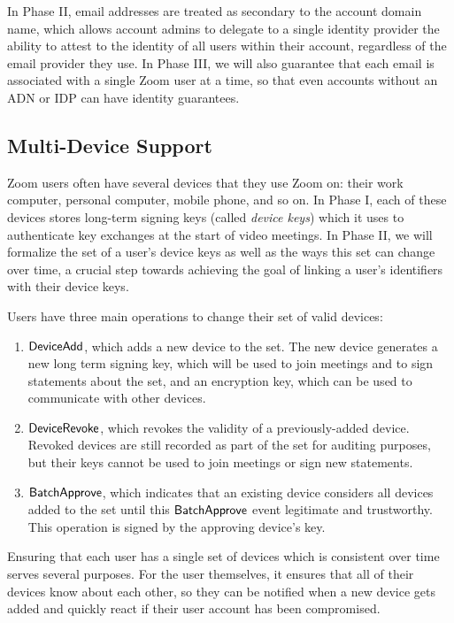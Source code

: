 In Phase II, email addresses are treated as secondary to the account domain name, which allows
account admins to delegate to a single identity provider the ability to attest to the identity of
all users within their account, regardless of the email provider they use. In Phase III, we will
also guarantee that each email is associated with a single Zoom user at a time, so that even
accounts without an ADN or IDP can have identity guarantees.

\subsection{Multi-Device Support}
\label{p2:multidev}

Zoom users often have several devices that they use Zoom on: their work computer, personal computer,
mobile phone, and so on. In Phase I, each of these devices stores long-term signing keys (called
\textit{device keys}) which it uses to authenticate key exchanges at the start of video meetings.
In Phase II, we will formalize the set of a user's device keys as well as the ways this set can
change over time, a crucial step towards achieving the goal of linking a user's identifiers with
their device keys.

Users have three main operations to change their set of valid devices:
\begin{enumerate}
\item $\mathsf{DeviceAdd}{}$, which adds a new device to the set. The new device generates a new long term
    signing key, which will be used to join meetings and to sign statements about the set, and
    an encryption key, which can be used to communicate with other devices.
\item $\mathsf{DeviceRevoke}{}$, which revokes the validity of a previously-added device. Revoked devices
    are still recorded as part of the set for auditing purposes, but their keys cannot be used to
    join meetings or sign new statements.
\item $\mathsf{BatchApprove}{}$, which indicates that an existing device considers all devices added to the
    set until this $\mathsf{BatchApprove}{}$ event legitimate and trustworthy. This operation is signed by
    the approving device’s key.
\end{enumerate}

Ensuring that each user has a single set of devices which is consistent over time serves several
purposes. For the user themselves, it ensures that all of their devices know about each other, so
they can be notified when a new device gets added and quickly react if their user account has been
compromised.

